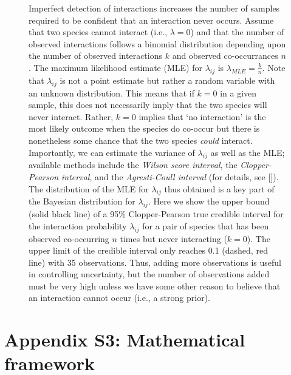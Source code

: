 \documentclass[12pt]{article}
\begin{document}
        \begin{figure}[h!]
          \caption{Imperfect detection of interactions increases the number of samples required to be confident that an interaction never occurs. Assume that two species cannot interact (i.e., $\lambda=0$) and that the number of observed interactions follows a binomial distribution depending upon the number of observed interactions $k$ and observed co-occurrances $n$. The maximum likelihood estimate (MLE) for $\lambda_{ij}$ is $\lambda_{MLE}=\frac{k}{n}$. Note that $\lambda_{ij}$ is not a point estimate but rather a random variable with an unknown distribution. This means that if $k = 0$ in a given sample, this does not necessarily imply that the two species will never interact. Rather, $k = 0$ implies that `no interaction' is the most likely outcome when the species do co-occur but there is nonetheless some chance that the two species \emph{could} interact.\\
          Importantly, we can estimate the variance of $\lambda_{ij}$ as well as the MLE; available methods include the \emph{Wilson score interval}, the \emph{Clopper-Pearson interval}, and the \emph{Agresti-Coull interval} (for details, see [\citealp{Brown2001}]). The distribution of the MLE for $\lambda_{ij}$ thus obtained is a key part of the Bayesian distribution for $\lambda_{ij}$.
          Here we show the upper bound (solid black line) of a 95\% Clopper-Pearson true credible interval for the interaction probability $\lambda_{ij}$ for a pair of species that has been observed co-occurring $n$ times but never interacting ($k = 0$). The upper limit of the credible interval only reaches 0.1 (dashed, red line) with 35 observations. Thus, adding more observations is useful in controlling uncertainty, but the number of observations added must be very high unless we have some other reason to believe that an interaction cannot occur (i.e., a strong prior).}
          \label{upper_limits}
          \begin{center}
          \end{center}
          \end{figure}


\clearpage

\section*{Appendix S3: Mathematical framework}
\end{document}
